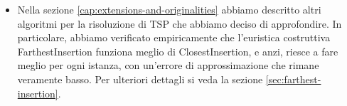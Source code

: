 \begin{itemize}
    \item Nella sezione \ref{cap:extensions-and-originalities} abbiamo
      descritto altri algoritmi per la risoluzione di TSP che abbiamo
      deciso di approfondire. In particolare, abbiamo verificato
      empiricamente che l'euristica costruttiva FarthestInsertion
      funziona meglio di ClosestInsertion, e anzi, riesce a fare
      meglio per ogni istanza, con un'errore di approssimazione che
      rimane veramente basso. Per ulteriori dettagli si veda la
      sezione \ref{sec:farthest-insertion}. \\
\end{itemize}
